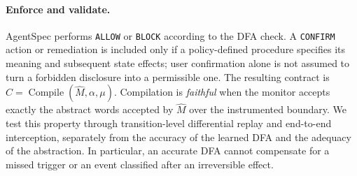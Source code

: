 \paragraph{Enforce and validate.}
AgentSpec performs \texttt{ALLOW} or \texttt{BLOCK} according to the DFA check. A \texttt{CONFIRM} action or remediation is included only if a policy-defined procedure specifies its meaning and subsequent state effects; user confirmation alone is not assumed to turn a forbidden disclosure into a permissible one. The resulting contract is $C=\operatorname{Compile}(\widehat M,\alpha,\mu)$. Compilation is \emph{faithful} when the monitor accepts exactly the abstract words accepted by $\widehat M$ over the instrumented boundary. We test this property through transition-level differential replay and end-to-end interception, separately from the accuracy of the learned DFA and the adequacy of the abstraction. In particular, an accurate DFA cannot compensate for a missed trigger or an event classified after an irreversible effect.
